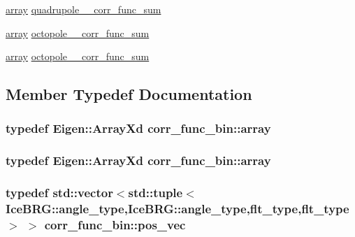 \begin{DoxyCompactItemize}
\item 
\hyperlink{structcorr__func__bin_a266e654606807bf423b915c6ef9ff7ab}{array} \hyperlink{structcorr__func__bin_a3b61d1f4b48cb5a55ba3486bdfd0da2d}{quadrupole\-\_\-\_\-corr\-\_\-func\-\_\-sum}
\item 
\hyperlink{structcorr__func__bin_a266e654606807bf423b915c6ef9ff7ab}{array} \hyperlink{structcorr__func__bin_a56b3e2512c17dcdbdbb2c580ffc2edcf}{octopole\-\_\-\_\-corr\-\_\-func\-\_\-sum}
\item 
\hyperlink{structcorr__func__bin_a266e654606807bf423b915c6ef9ff7ab}{array} \hyperlink{structcorr__func__bin_ae880521104f5c188a992c2b2b1359591}{octopole\-\_\-\_\-corr\-\_\-func\-\_\-sum}
\end{DoxyCompactItemize}


\subsection{Member Typedef Documentation}
\hypertarget{structcorr__func__bin_a266e654606807bf423b915c6ef9ff7ab}{
\subsubsection[{array}]{\setlength{\rightskip}{0pt plus 5cm}typedef Eigen\-::\-Array\-Xd {\bf corr\-\_\-func\-\_\-bin\-::array}}}\label{structcorr__func__bin_a266e654606807bf423b915c6ef9ff7ab}
\hypertarget{structcorr__func__bin_a266e654606807bf423b915c6ef9ff7ab}{
\subsubsection[{array}]{\setlength{\rightskip}{0pt plus 5cm}typedef Eigen\-::\-Array\-Xd {\bf corr\-\_\-func\-\_\-bin\-::array}}}\label{structcorr__func__bin_a266e654606807bf423b915c6ef9ff7ab}
\hypertarget{structcorr__func__bin_a683c7075740b3dcae9ebb1ac758c0bfa}{
\subsubsection[{pos\-\_\-vec}]{\setlength{\rightskip}{0pt plus 5cm}typedef std\-::vector$<$std\-::tuple$<${\bf Ice\-B\-R\-G\-::angle\-\_\-type},{\bf Ice\-B\-R\-G\-::angle\-\_\-type},{\bf flt\-\_\-type},{\bf flt\-\_\-type}$>$ $>$ {\bf corr\-\_\-func\-\_\-bin\-::pos\-\_\-vec}}}\label{structcorr__func__bin_a683c7075740b3dcae9ebb1ac758c0bfa}
